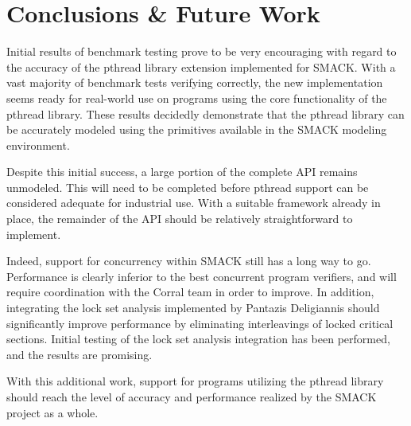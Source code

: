 \chapter{Conclusions \& Future Work}\label{ch:conclusion}
Initial results of benchmark testing prove to be very encouraging with
regard to the accuracy of the pthread library extension implemented
for SMACK.  With a vast majority of benchmark tests verifying
correctly, the new implementation seems ready for real-world use on
programs using the core functionality of the pthread library. These
results decidedly demonstrate that the pthread library can be
accurately modeled using the primitives available in the SMACK
modeling environment. 

Despite this initial success, a large portion of the complete API
remains unmodeled.  This will need to be completed before pthread
support can be considered adequate for industrial use.  With a
suitable framework already in place, the remainder of the  API should
be relatively straightforward to implement.

Indeed, support for concurrency within SMACK still has a long way to
go.  Performance is clearly inferior to the best concurrent program
verifiers, and will require coordination with the Corral team in order
to improve. In addition, integrating the lock set analysis implemented
by Pantazis Deligiannis should significantly improve performance by
eliminating interleavings of locked critical sections.  Initial
testing of the lock set analysis integration has been performed, and
the results are promising.

With this additional work, support for programs utilizing the pthread
library should reach the level of accuracy and performance realized by
the SMACK project as a whole.

